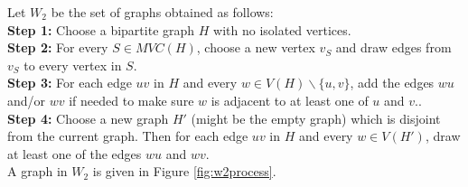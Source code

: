 \documentclass[11pt]{article}
\theoremstyle{definition}
\begin{document}
Let $W_2$ be the set of graphs obtained as follows:\\
{\bf Step 1:} Choose a bipartite graph $H$ with no isolated vertices.\\
{\bf Step 2:} For every $S\in MVC(H)$, choose a new vertex $v_S$ and draw edges from $v_S$ to every vertex in $S$.\\
{\bf Step 3:} For each edge $uv$ in $H$ and every $w\in V(H)\backslash \{u,v\}$, add the edges $wu$ and/or $wv$ if needed to make sure $w$ is adjacent to at least one of $u$ and $v$..\\
{\bf Step 4:} 
Choose a new graph $H'$ (might be the empty graph) which is disjoint from the current graph. Then for each edge $uv$ in $H$ and every $w\in V(H')$, draw at least one of the edges $wu$ and $wv$.\\
A graph in $W_2$ is given in Figure \ref{fig:w2process}.
\end{document}
